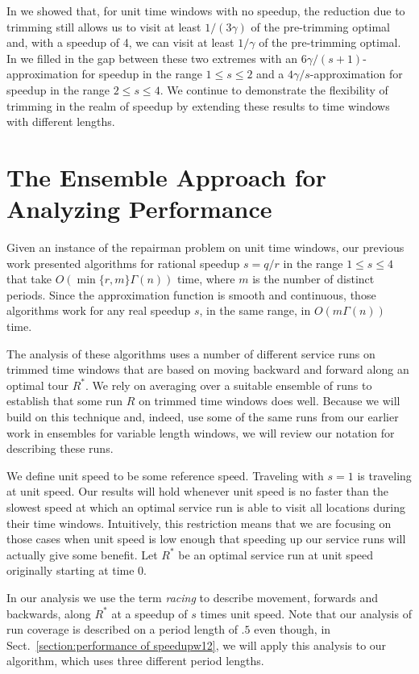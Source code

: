 \documentclass[11pt]{article}
\begin{document}
In \cite{Frederickson6} we showed that, for unit time windows with no speedup, the reduction due to trimming still allows us to visit at least $1/(3\gamma)$ of the pre-trimming optimal and, with a speedup of 4, we can visit at least $1/\gamma$ of the pre-trimming optimal.  In \cite{Frederickson5} we filled in the gap between these two extremes with an $6\gamma/(s + 1)$-approximation for speedup in the range $1 \leq s \leq 2$ and a $4\gamma/s$-approximation for speedup in the range $2 \leq s \leq 4$.  We continue to demonstrate the flexibility of trimming in the realm of speedup by extending these results to time windows with different lengths.


\section{The Ensemble Approach for Analyzing Performance}
\label{section:ensemble}

Given an instance of the repairman problem on unit time windows, our previous work \cite{Frederickson5} presented algorithms for rational speedup $s = q/r$ in the range $1 \leq s \leq 4$ that take $O(\min\{r, m\}\Gamma(n))$ time, where $m$ is the number of distinct periods.  Since the approximation function is smooth and continuous, those algorithms work for any real speedup $s$, in the same range, in  $O(m\Gamma(n))$ time.  

The analysis of these algorithms uses a number of different service runs on trimmed time windows that are based on moving backward and forward along an optimal tour $R^*$.  We rely on averaging over a suitable ensemble of runs to establish that some run $R$ on trimmed time windows does well.  Because we will build on this technique and, indeed, use some of the same runs from our earlier work \cite{Frederickson5} in ensembles for variable length windows, we will review our notation for describing these runs.

We define unit speed to be some reference speed.  Traveling with $s = 1$ is traveling at unit speed.  Our results will hold whenever unit speed is no faster than the slowest speed at which an optimal service run is able to visit all locations during their time windows.  Intuitively, this restriction means that we are focusing on those cases when unit speed is low enough that speeding up our service runs will actually give some benefit.
Let $R^*$ be an optimal service run at unit speed originally starting at time 0.

In our analysis
we use the term {\em racing} to describe movement, forwards and backwards, along $R^*$ at a speedup of $s$ times unit speed.  Note that our analysis of run coverage is described on a period length of $.5$ even though, in Sect.~\ref{section:performance of speedupw12}, we will apply this analysis to our algorithm, which uses three different period lengths.
\end{document}
